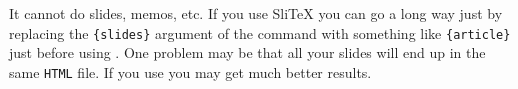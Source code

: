 \begin{htmllist}
\item [It cannot do slides, memos, etc. ] 
If you use Sli\TeX{} you can go a long way just by replacing 
the \verb|{slides}| argument of the  command with 
something like \verb|{article}| just before using \latextohtml.
One problem may be that all your slides will end up in the  same \texttt{HTML} 
file.
If you use  you may get much better results.
\end{htmllist}

